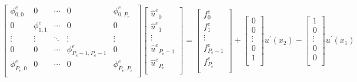 \begin{eqnarray}
\label{localsystem}
\begin{bmatrix}
    \phi_{0,0}^e   & 0            & \cdots & 0                    & \phi_{0,P_e}^e      \\
    0              & \phi_{1,1}^e & \cdots & 0                    & 0                   \\
    \vdots         & \vdots       & \ddots & \vdots               & \vdots              \\
    0              & 0            & \cdots & \phi_{P_e-1,P_e-1}^e & 0                   \\
    \phi_{P_e,0}^e & 0            & \cdots & 0                    & \phi_{P_e,P_e}^e    \\
\end{bmatrix}
\begin{bmatrix}
    {\hat u^e}_{0}      \\
    {\hat u^e}_{1}      \\
    \vdots              \\
    {\hat u^e}_{P_e-1}  \\
    {\hat u^e}_{P_e}    \\
\end{bmatrix}
=
\begin{bmatrix}
    f^e_{0}     \\
    f^e_{1}     \\
    \vdots      \\
    f^e_{P_e-1} \\
    f^e_{P_e}   \\
\end{bmatrix}
+
\begin{bmatrix}
    0       \\
    0       \\
    \vdots  \\
    0       \\
    1       \\
\end{bmatrix}
u^{\prime}(x_2)
-
\begin{bmatrix}
    1       \\
    0       \\
    \vdots  \\
    0       \\
    0       \\
\end{bmatrix}
u^{\prime}(x_1)
\end{eqnarray}
